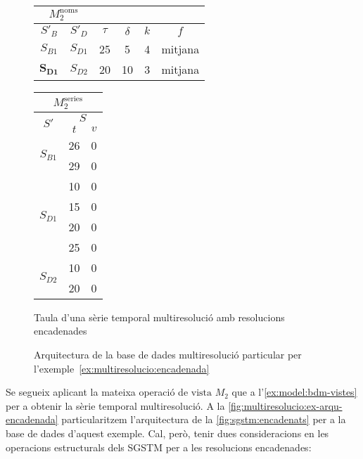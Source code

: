 \begin{example} 
  \begin{figure}[tp]
    \centering
    \begin{tabular}{|c|c|c|c|c|c|}
      \multicolumn{2}{c}{$M_2^{\text{noms}}$} \\ \hline
      $S'_B$  & $S'_D$ & $\tau$ & $\delta$ & $k$ & $f$ \\ \hline
      $S_{B1}$ & $S_{D1}$ & 25 & 5  & 4 & mitjana  \\
      $\mathbf{S_{D1}}$ & $S_{D2}$ & 20 & 10 & 3 & mitjana  \\ \hline
    \end{tabular}\qquad
    \begin{tabular}{|c|c|c|}
      \multicolumn{3}{c}{$M_2^{\text{series}}$} \\ \hline
      \multirow{2}{*}{$S'$}  &  \multicolumn{2}{c|}{$S$} \\ \cline{2-3}
      & $t$      & $v$  \\ \hline
      \multirow{2}{*}{$S_{B1}$} 
      & 26 & 0 \\ 
      & 29 & 0 \\ \hline
      \multirow{4}{*}{$S_{D1}$} 
      & 10 & 0 \\ 
      & 15 & 0 \\ 
      & 20 & 0 \\ 
      & 25 & 0 \\ \hline
      \multirow{2}{*}{$S_{D2}$} 
      & 10 & 0 \\ 
      & 20 & 0 \\ \hline
    \end{tabular}
    \caption{Taula d'una sèrie temporal multiresolució amb resolucions encadenades}
    \label{fig:multiresolucio:exencadenat}
  \end{figure}




  \begin{figure}[tp]
    \centering
    
    \caption{Arquitectura de la base de dades multiresolució
      particular per l'exemple~\ref{ex:multiresolucio:encadenada}}
    \label{fig:multiresolucio:ex-arqu-encadenada}
  \end{figure}



  Se segueix aplicant la mateixa operació de $\text{vista } M_2$ que a
  l'\autoref{ex:model:bdm-vistes} per a obtenir la sèrie temporal
  multiresolució. A la \autoref{fig:multiresolucio:ex-arqu-encadenada}
  particularitzem l'arquitectura de la \autoref{fig:sgstm:encadenats}
  per a la base de dades d'aquest exemple. Cal, però, tenir dues
  consideracions en les operacions estructurals dels \gls{SGSTM} per a
  les resolucions encadenades: 


\end{example}

